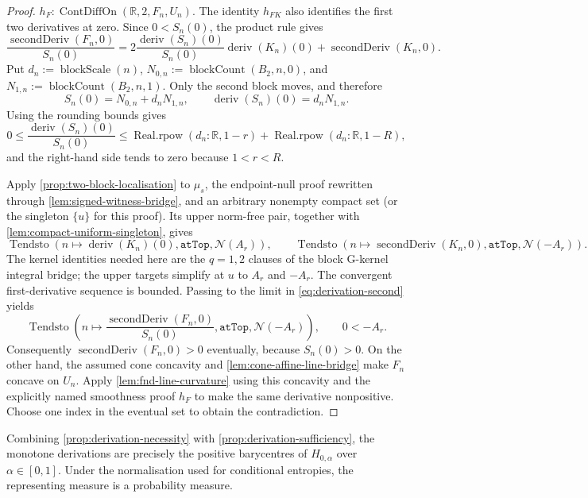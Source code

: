 \documentclass[9pt]{extarticle}
\theoremstyle{definition}
\theoremstyle{remark}
\newcommand{\R}{\mathbb R}
\begin{document}
\begin{proof}
$h_F:\operatorname{ContDiffOn}(\R,2,F_n,U_n)$.  The identity $h_{FK}$ also
identifies the first two derivatives at zero.  Since $0<S_n(0)$, the
product rule gives
\begin{equation}
 \frac{\operatorname{secondDeriv}(F_n,0)}{S_n(0)}
 =2\frac{\operatorname{deriv}(S_n)(0)}{S_n(0)}
   \operatorname{deriv}(K_n)(0)+\operatorname{secondDeriv}(K_n,0).
 \label{eq:derivation-second}
\end{equation}
Put $d_n:=\operatorname{blockScale}(n)$,
$N_{0,n}:=\operatorname{blockCount}(B_2,n,0)$, and
$N_{1,n}:=\operatorname{blockCount}(B_2,n,1)$. Only the second block moves,
and therefore
\[
 S_n(0)=N_{0,n}+d_nN_{1,n},\qquad
 \operatorname{deriv}(S_n)(0)=d_nN_{1,n}.
\]
Using the rounding bounds gives
\[
 0\leq\frac{\operatorname{deriv}(S_n)(0)}{S_n(0)}
 \leq
 \operatorname{Real.rpow}(d_n:\R,1-r)
 +\operatorname{Real.rpow}(d_n:\R,1-R),
\]
and the right-hand side tends to zero because $1<r<R$.

Apply \cref{prop:two-block-localisation} to $\mu_s$, the endpoint-null proof
rewritten through \cref{lem:signed-witness-bridge}, and an arbitrary
nonempty compact set (or the singleton $\{u\}$ for this proof).  Its upper
norm-free pair, together with
\cref{lem:compact-uniform-singleton}, gives
\[
 \operatorname{Tendsto}
  (n\mapsto\operatorname{deriv}(K_n)(0),
    \texttt{atTop},\mathcal N(A_r)),
\qquad
 \operatorname{Tendsto}
  (n\mapsto\operatorname{secondDeriv}(K_n,0),
    \texttt{atTop},\mathcal N(-A_r)).
\]
The kernel identities needed here are the $q=1,2$ clauses of the block
G-kernel integral bridge; the upper targets simplify at $u$ to
$A_r$ and $-A_r$.  The convergent first-derivative sequence is bounded.
Passing to the limit in \cref{eq:derivation-second} yields
\[
 \operatorname{Tendsto}\!\left(
  n\mapsto\frac{\operatorname{secondDeriv}(F_n,0)}{S_n(0)},
  \texttt{atTop},\mathcal N(-A_r)\right),
\qquad 0<-A_r.
\]
Consequently $\operatorname{secondDeriv}(F_n,0)>0$ eventually, because
$S_n(0)>0$.  On the other hand, the assumed cone concavity and
\cref{lem:cone-affine-line-bridge} make $F_n$ concave on $U_n$.  Apply
\cref{lem:fnd-line-curvature} using this concavity and the explicitly named
smoothness proof $h_F$ to make the same derivative nonpositive.  Choose
one index in the eventual set to obtain the contradiction.
\end{proof}

Combining \cref{prop:derivation-necessity} with
\cref{prop:derivation-sufficiency}, the monotone derivations are precisely the
positive barycentres of $H_{0,\alpha}$ over $\alpha\in[0,1]$. Under the
normalisation used for conditional entropies, the representing measure is a
probability measure.
\end{document}
